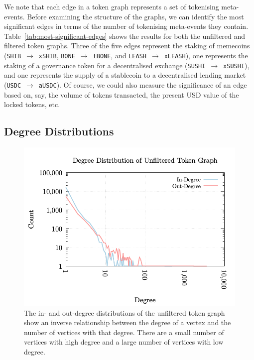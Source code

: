 We note that each edge in a token graph represents a set of tokenising
meta-events.  Before examining the structure of the graphs, we can
identify the most significant edges in terms of the number of
tokenising meta-events they contain.
Table~\ref{tab:most-significant-edges} shows the results for both the
unfiltered and filtered token graphs.  Three of the five edges
represent the staking of memecoins
(\texttt{SHIB}~$\rightarrow$~\texttt{xSHIB},
\texttt{BONE}~$\rightarrow$~\texttt{tBONE}, and
\texttt{LEASH}~$\rightarrow$~\texttt{xLEASH}), one represents the
staking of a governance token for a decentralised exchange
(\texttt{SUSHI}~$\rightarrow$~\texttt{xSUSHI}), and one represents the
supply of a stablecoin to a decentralised lending market
(\texttt{USDC}~$\rightarrow$~\texttt{aUSDC}).  Of course, we could
also measure the significance of an edge based on, say, the volume of
tokens transacted, the present USD value of the locked tokens, etc.

\subsection{Degree Distributions}\label{sec:analysis-degree-distribution}

\begin{figure}
  \centerline{\includegraphics[width=\columnwidth]{img/degree-distributions/unfiltered-token-graph-degrees.png}}
  \caption{The in- and out-degree distributions of the unfiltered
    token graph show an inverse relationship between the degree of a
    vertex and the number of vertices with that degree.  There are a
    small number of vertices with high degree and a large number of
    vertices with low
    degree.}\label{fig:unfiltered-token-graph-degrees}
\end{figure}

